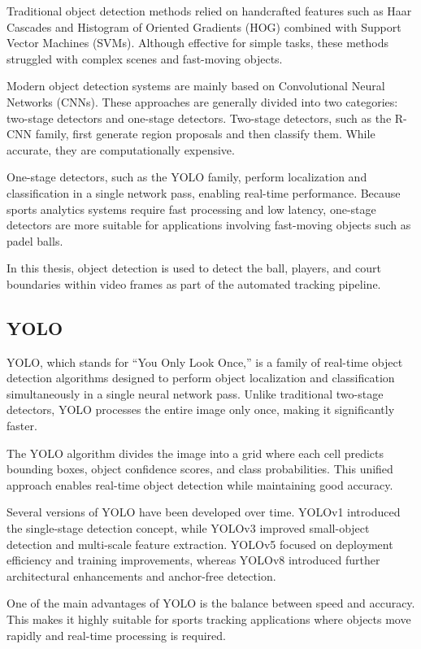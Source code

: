 Traditional object detection methods relied on handcrafted features such as Haar Cascades and Histogram of Oriented Gradients (HOG) combined with Support Vector Machines (SVMs). Although effective for simple tasks, these methods struggled with complex scenes and fast-moving objects.

Modern object detection systems are mainly based on Convolutional Neural Networks (CNNs). These approaches are generally divided into two categories: two-stage detectors and one-stage detectors. Two-stage detectors, such as the R-CNN family, first generate region proposals and then classify them. While accurate, they are computationally expensive.

One-stage detectors, such as the YOLO family, perform localization and classification in a single network pass, enabling real-time performance. Because sports analytics systems require fast processing and low latency, one-stage detectors are more suitable for applications involving fast-moving objects such as padel balls.

In this thesis, object detection is used to detect the ball, players, and court boundaries within video frames as part of the automated tracking pipeline.

\subsection{YOLO}

YOLO, which stands for ``You Only Look Once,'' is a family of real-time object detection algorithms designed to perform object localization and classification simultaneously in a single neural network pass. Unlike traditional two-stage detectors, YOLO processes the entire image only once, making it significantly faster.

The YOLO algorithm divides the image into a grid where each cell predicts bounding boxes, object confidence scores, and class probabilities. This unified approach enables real-time object detection while maintaining good accuracy.

Several versions of YOLO have been developed over time. YOLOv1 introduced the single-stage detection concept, while YOLOv3 improved small-object detection and multi-scale feature extraction. YOLOv5 focused on deployment efficiency and training improvements, whereas YOLOv8 introduced further architectural enhancements and anchor-free detection.

One of the main advantages of YOLO is the balance between speed and accuracy. This makes it highly suitable for sports tracking applications where objects move rapidly and real-time processing is required.

